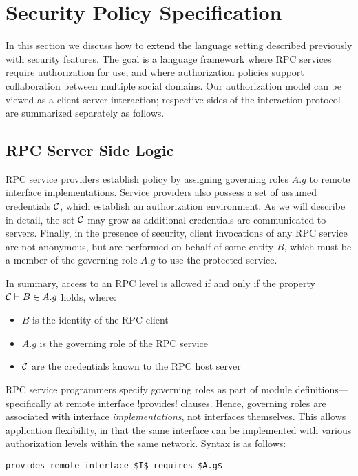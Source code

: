 \section{Security Policy Specification}
\label{section-security-extensions}

In this section we discuss how to extend the language setting described previously with security
features. The goal is a language framework where RPC services require authorization for use, and
where authorization policies support collaboration between multiple social domains. Our
authorization model can be viewed as a client-server interaction; respective sides of the
interaction protocol are summarized separately as follows.

\subsection{RPC Server Side Logic}
\label{section-rpc-server-side}

RPC service providers establish policy by assigning governing roles $A.g$ to remote interface
implementations. Service providers also possess a set of assumed credentials $\mathcal{C}$, which
establish an authorization environment. As we will describe in detail, the set $\mathcal{C}$ may grow
as additional credentials are communicated to servers. Finally, in the presence of security,
client invocations of any RPC service are not anonymous, but are performed on behalf of some
entity $B$, which must be a member of the governing role $A.g$ to use the protected service.

In summary, access to an RPC level is allowed if and only if the property $\mathcal{C} \vdash B \in
A.g$ holds, where:
\begin{itemize}
  \item $B$ is the identity of the RPC client
  \item $A.g$ is the governing role of the RPC service
  \item $\mathcal{C}$ are the credentials known to the RPC host server
\end{itemize}
RPC service programmers specify governing roles as part of module definitions---specifically at
remote interface !provides! clauses. Hence, governing roles are associated with interface
\emph{implementations}, not interfaces themselves. This allows application flexibility, in that
the same interface can be implemented with various authorization levels within the same network.
Syntax is as follows:
\begin{lstlisting}[mathescape=true]
provides remote interface $I$ requires $A.g$
\end{lstlisting}

